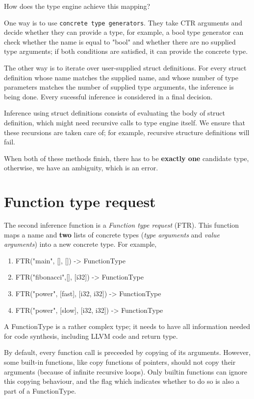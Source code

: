 \documentclass[times, utf8, diplomski]{fer}
\theoremstyle{definition}
\begin{document}
How does the type engine achieve this mapping? 

One way is to use \texttt{concrete type generators}.
They take CTR arguments and decide whether they can provide a type, for example,
a bool type generator can check whether the name is equal to "bool" and whether 
there are no supplied type arguments; if both conditions are satisfied,
it can provide the concrete type.

The other way is to iterate over user-supplied struct definitions.
For every struct definition whose name matches the supplied name, 
and whose number of type parameters matches the number of supplied type arguments,
the inference is being done. Every sucessful inference is considered in a final decision.

Inference using struct definitions consists of evaluating the body of struct definition,
which might need recursive calls to type engine itself. We ensure that these
recursions are taken care of; for example, recursive structure definitions will fail.

When both of these methods finish, there has to be \textbf{exactly one} candidate type,
otherwise, we have an ambiguity, which is an error.


\section{Function type request}

The second inference function is a \textit{Function type request} (FTR). This function maps
a name and \textbf{two} lists of concrete types (\textit{type arguments} and \textit{value arguments}) 
into a new concrete type. For example,

\begin{enumerate}
    \item FTR("main", [], []) -> FunctionType
    \item FTR("fibonacci",[], [i32]) -> FunctionType
    \item FTR("power", [fast], [i32, i32]) -> FunctionType
    \item FTR("power", [slow], [i32, i32]) -> FunctionType
\end{enumerate}

A FunctionType is a rather complex type; it needs to have all information needed for code synthesis, 
including LLVM code and return type. 

By default, every function call is preceeded by copying of its arguments. However, some built-in functions,
like copy functions of pointers, should not copy their arguments (because of infinite recursive loops).
Only builtin functions can ignore this copying behaviour, and the flag which indicates
whether to do so is also a part of a FunctionType.
\end{document}
